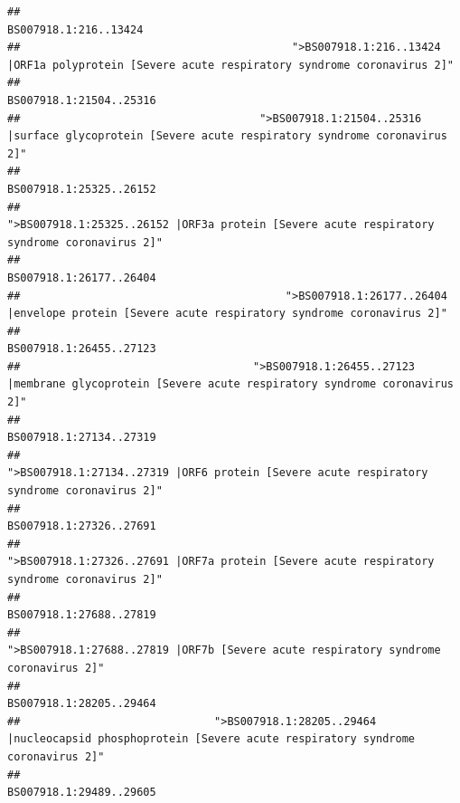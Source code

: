 \documentclass[
]{article}
\begin{document}
\begin{verbatim}
##                                                                                                                  BS007918.1:216..13424 
##                                          ">BS007918.1:216..13424 |ORF1a polyprotein [Severe acute respiratory syndrome coronavirus 2]" 
##                                                                                                                BS007918.1:21504..25316 
##                                     ">BS007918.1:21504..25316 |surface glycoprotein [Severe acute respiratory syndrome coronavirus 2]" 
##                                                                                                                BS007918.1:25325..26152 
##                                            ">BS007918.1:25325..26152 |ORF3a protein [Severe acute respiratory syndrome coronavirus 2]" 
##                                                                                                                BS007918.1:26177..26404 
##                                         ">BS007918.1:26177..26404 |envelope protein [Severe acute respiratory syndrome coronavirus 2]" 
##                                                                                                                BS007918.1:26455..27123 
##                                    ">BS007918.1:26455..27123 |membrane glycoprotein [Severe acute respiratory syndrome coronavirus 2]" 
##                                                                                                                BS007918.1:27134..27319 
##                                             ">BS007918.1:27134..27319 |ORF6 protein [Severe acute respiratory syndrome coronavirus 2]" 
##                                                                                                                BS007918.1:27326..27691 
##                                            ">BS007918.1:27326..27691 |ORF7a protein [Severe acute respiratory syndrome coronavirus 2]" 
##                                                                                                                BS007918.1:27688..27819 
##                                                    ">BS007918.1:27688..27819 |ORF7b [Severe acute respiratory syndrome coronavirus 2]" 
##                                                                                                                BS007918.1:28205..29464 
##                              ">BS007918.1:28205..29464 |nucleocapsid phosphoprotein [Severe acute respiratory syndrome coronavirus 2]" 
##                                                                                                                BS007918.1:29489..29605 

\end{verbatim}
\end{document}
